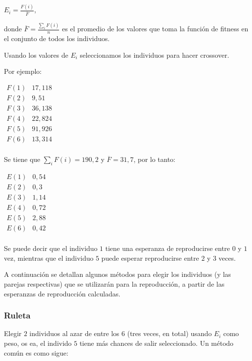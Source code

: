\documentclass[10pt,a4paper]{article}
\begin{document}
\begin{center}
$E_i = \frac{F(i)}{\overline{F}}$,
\end{center}

donde $\overline{F} =\frac{\sum\limits_{i} F(i)}{n}$ es el promedio de los valores que toma la función de fitness en el conjunto de todos los individuos.

Usando los valores de $E_i$ seleccionamos los individuos para hacer crossover.

Por ejemplo:

\begin{center}
$\begin{array}{c|r} F(1) & 17,118\\ F(2) &9,51\\ F(3) &36,138\\ F(4) &22,824\\ F(5)&91,926\\ F(6)&13,314\\ \end{array}$
\end{center}

Se tiene que $\sum\limits_{i}F(i) = 190,2$ y $\overline{F} = 31, 7$, por lo tanto:

\begin{center}
$\begin{array}{c|r} E(1) &0,54\\ E(2) & 0,3\\ E(3) & 1,14\\ E(4) & 0,72\\ E(5)& 2,88\\ E(6)& 0,42\\ \end{array}$
\end{center}

Se puede decir que el individuo $1$ tiene una esperanza de reproducirse entre $0$ y $1$ vez, mientras que el individuo $5$ puede esperar reproducirse entre $2$ y $3$ veces.

A continuación se detallan algunos métodos para elegir los individuos (y las parejas respectivas) que se utilizarán para la reproducción, a partir de las esperanzas de reproducción calculadas.

\subsubsection*{Ruleta}

Elegir $2$ individuos al azar de entre los $6$ (tres veces, en total) usando $E_i$ como peso, os ea, el individo $5$ tiene más chances de salir seleccionado. Un método común es como sigue:
\end{document}

